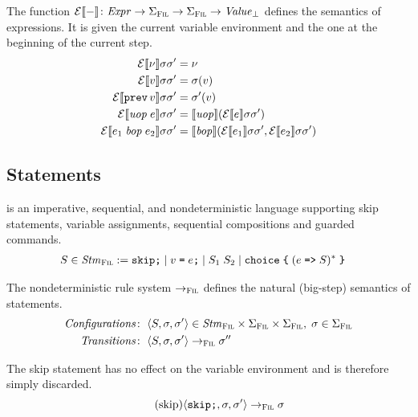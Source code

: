 \documentclass[a4paper,10pt,english]{article}
\begin{document}
The function $\mathcal{E} \llbracket - \rrbracket \colon \mathit{Expr} \rightarrow \Sigma_\textsc{Fil} \rightarrow \Sigma_\textsc{Fil} \rightarrow \mathit{Value}_\bot$ defines the
semantics of expressions. It is given the current variable environment and the one at the beginning of the current step.
\begin{align*}
	\mathcal{E} \llbracket \nu \rrbracket \sigma \sigma' &= \nu \\
	\mathcal{E} \llbracket v \rrbracket \sigma \sigma' &= \sigma(v) \\
	\mathcal{E} \llbracket \mathtt{prev} \,v \rrbracket \sigma \sigma' &= \sigma'(v) \\
	\mathcal{E} \llbracket \mathit{uop}\; e \rrbracket \sigma \sigma' &= \llbracket \mathit{uop} \rrbracket (\mathcal{E} \llbracket e \rrbracket \sigma \sigma')
	\\
	\mathcal{E} \llbracket e_1 \;\mathit{bop}\; e_2 \rrbracket \sigma \sigma' &= \llbracket \mathit{bop} \rrbracket (\mathcal{E} \llbracket e_1 \rrbracket
	\sigma \sigma', \mathcal{E} \llbracket e_2 \rrbracket \sigma \sigma')
\end{align*}

\subsection{Statements}

\Fil is an imperative, sequential, and nondeterministic language supporting skip statements, variable assignments, sequential
compositions and guarded commands.
\begin{align*}
	S \in \mathit{Stm}_\textsc{Fil} & :=
		\texttt{skip;} \mid 
		v\; \texttt{=}\; e \texttt{;} \mid 
		S_1 \; S_2 \mid
		\texttt{choice} \; \texttt{\{} \; (e \; \texttt{=>} \; S)^* \; \texttt{\}}
\end{align*}

The nondeterministic rule system $\rightarrow_{\textsc{Fil}}$ defines the natural (big-step) semantics of statements.
\begin{align*}
	\mathit{Configurations} \colon & \;\langle S, \sigma, \sigma' \rangle \in \mathit{Stm}_\textsc{Fil} \times \Sigma_\textsc{Fil} \times
	\Sigma_\textsc{Fil}, \; \sigma \in \Sigma_\textsc{Fil}
	\\
	\mathit{Transitions} \colon & \;\langle S, \sigma, \sigma' \rangle \rightarrow_{\textsc{Fil}} \sigma''
\end{align*}

The skip statement has no effect on the variable environment and is therefore simply discarded.
\begin{equation*}
	\tag{skip}
	\langle \texttt{skip;}, \sigma, \sigma' \rangle
		\rightarrow_{\textsc{Fil}}
	\sigma
\end{equation*}
\end{document}
